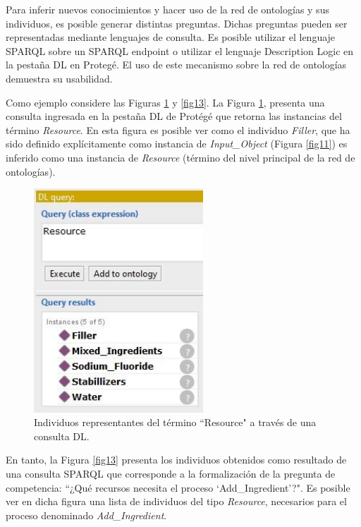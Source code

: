 \documentclass[journal]{IEEEtran}
\begin{document}
Para inferir nuevos conocimientos y hacer uso de la red de ontolog\'ias y sus individuos, es posible generar distintas preguntas. Dichas preguntas pueden ser representadas mediante lenguajes de consulta. Es posible utilizar el lenguaje SPARQL sobre un SPARQL endpoint o utilizar el lenguaje Description Logic en la pestaña DL en Proteg\'e. El uso de este mecanismo sobre la red de ontolog\'ias demuestra su usabilidad. 

Como ejemplo considere las Figuras \ref{fig12} y \ref{fig13}. La Figura \ref{fig12}, presenta una consulta ingresada en la pestaña DL de Prot\'eg\'e que retorna las instancias del t\'ermino \emph{Resource}. En esta figura es posible ver como el individuo \emph{Filler}, que ha sido definido expl\'icitamente como instancia de \emph{Input\_Object} (Figura \ref{fig11}) es inferido como una instancia de \emph{Resource} (t\'ermino del nivel principal de la red de ontolog\'ias).


\begin{figure}[!t]
\centering
\includegraphics[width=2.5in]{figures/figure12.jpg}
\caption{Individuos representantes del t\'ermino ``Resource" a trav\'es de una consulta DL.}
\label{fig12}
\end{figure}

En tanto, la Figura \ref{fig13} presenta los individuos obtenidos como resultado de una consulta SPARQL que corresponde a la formalizaci\'on de la pregunta de competencia: ``¿Qu\'e recursos necesita el proceso ‘Add\_Ingredient’?". Es posible ver en dicha figura una lista de individuos del tipo \emph{Resource}, necesarios para el proceso denominado \emph{Add\_Ingredient}.
\end{document}
